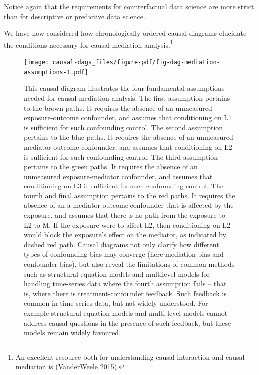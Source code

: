 \documentclass[
  singlecolumn]{article}
\begin{document}
Notice again that the requirements for counterfactual data science are
more strict than for descriptive or predictive data science.

We have now considered how chronologically ordered causal diagrams
elucidate the conditions necessary for causal mediation
analysis.\footnote{An excellent resource both for understanding causal
  interaction and causal mediation is
  (\protect\hyperlink{ref-vanderweele2015}{VanderWeele 2015}).}

\begin{figure}

{\centering \texttt{[image: causal-dags\_files/figure-pdf/fig-dag-mediation-assumptions-1.pdf]}

}

\caption{\label{fig-dag-mediation-assumptions}This causal diagram
illustrates the four fundamental assumptions needed for causal mediation
analysis. The first assumption pertains to the brown paths. It requires
the absence of an unmeasured exposure-outcome confounder, and assumes
that conditioning on L1 is sufficient for such confounding control. The
second assumption pertains to the blue paths. It requires the absence of
an unmeasured mediator-outcome confounder, and assumes that conditioning
on L2 is sufficient for such confounding control. The third assumption
pertains to the green paths. It requires the absence of an unmeasured
exposure-mediator confounder, and assumes that conditioning on L3 is
sufficient for such confounding control. The fourth and final assumption
pertains to the red paths. It requires the absence of an a
mediator-outcome confounder that is affected by the exposure, and
assumes that there is no path from the exposure to L2 to M. If the
exposure were to affect L2, then conditioning on L2 would block the
exposure's effect on the mediator, as indicated by dashed red path.
Causal diagrams not only clarify how different types of confounding bias
may converge (here mediation bias and confounder bias), but also reveal
the limitations of common methods such as structural equation models and
multilevel models for handling time-series data where the fourth
assumption fails -- that is, where there is treatment-confounder
feedback. Such feedback is common in time-series data, but not widely
understood. For example structural equation models and multi-level
models cannot address causal questions in the presence of such feedback,
but these models remain widely favoured.}

\end{figure}
\end{document}
